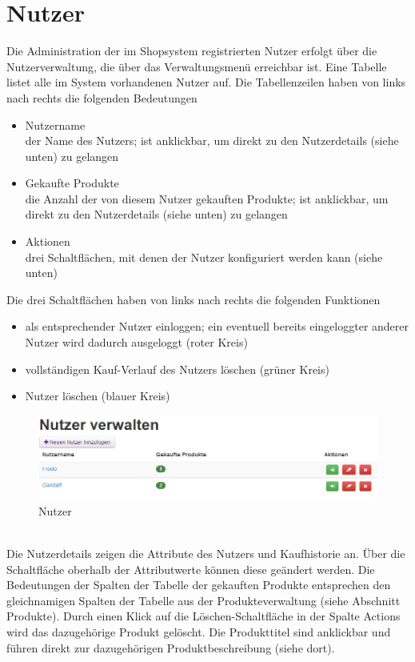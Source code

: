 \section{Nutzer}
Die Administration der im Shopsystem registrierten Nutzer erfolgt über die Nutzerverwaltung, die über das Verwaltungsmenü erreichbar ist. Eine Tabelle listet alle im System vorhandenen Nutzer auf. Die Tabellenzeilen haben von links nach rechts die folgenden Bedeutungen
\begin{itemize}
  \item Nutzername \\
        der Name des Nutzers; ist anklickbar, um direkt zu den  Nutzerdetails (siehe unten) zu gelangen
  \vspace*{-0.5em}
  \item Gekaufte Produkte \\
        die Anzahl der von diesem Nutzer gekauften Produkte; ist anklickbar, um direkt zu den Nutzerdetails (siehe unten) zu gelangen
  \vspace*{-0.5em}
  \item Aktionen \\
        drei Schaltflächen, mit denen der Nutzer konfiguriert werden kann (siehe unten)
\end{itemize}
Die drei Schaltflächen haben von links nach rechts die folgenden Funktionen
\begin{itemize}
  \item als entsprechender Nutzer einloggen; ein eventuell bereits eingeloggter anderer Nutzer wird dadurch ausgeloggt (roter Kreis)
  \vspace*{-0.5em}
  \item vollständigen Kauf-Verlauf des Nutzers löschen (grüner Kreis)
  \vspace*{-0.5em}
  \item Nutzer löschen (blauer Kreis)
\end{itemize}

\begin{figure}[h!]
  \centering
  \includegraphics[width=\textwidth]{img/Nutzer.png}
  \caption{Nutzer}
  \label{fig:Nutzer}
\end{figure}
\text{}\vspace*{-1em}\\
Die Nutzerdetails zeigen die Attribute des Nutzers und Kaufhistorie an. Über die Schaltfläche oberhalb der Attributwerte können diese geändert werden. Die Bedeutungen der Spalten der Tabelle der gekauften Produkte entsprechen den gleichnamigen Spalten der Tabelle aus der Produkteverwaltung (siehe Abschnitt Produkte). Durch einen Klick auf die Löschen-Schaltfläche in der Spalte Actions wird das dazugehörige Produkt gelöscht.  Die Produkttitel sind anklickbar und führen direkt zur dazugehörigen Produktbeschreibung (siehe dort).

